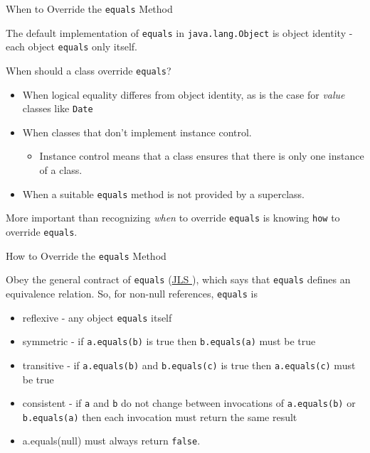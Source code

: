 \documentclass{beamer}
\begin{document}
\begin{frame}[fragile]{When to Override the {\tt equals} Method}


The default implementation of {\tt equals} in {\tt java.lang.Object} is object identity - each object {\tt equals} only itself.

When should a class override {\tt equals}?
\begin{itemize}
\item When logical equality differes from object identity, as is the case for {\it value} classes like {\tt Date}
\item When classes that don't implement instance control.
  \begin{itemize}
  \item Instance control means that a class ensures that there is only one instance of a class.  
  \end{itemize}
\item When a suitable {\tt equals} method is not provided by a superclass.
\end{itemize}

More important than recognizing {\it when} to override {\tt equals} is knowing {\tt how} to override {\tt equals}.
\end{frame}

\begin{frame}[fragile]{How to Override the {\tt equals} Method}


Obey the general contract of {\tt equals} (\href{}{JLS }), which says that {\tt equals} defines an equivalence relation.  So, for non-null references, {\tt equals} is
\begin{itemize}
\item reflexive - any object {\tt equals} itself
\item symmetric - if {\tt a.equals(b)} is true then {\tt b.equals(a)} must be true
\item transitive - if {\tt a.equals(b)} and {\tt b.equals(c)} is true then {\tt a.equals(c)} must be true
\item consistent - if {\tt a} and {\tt b} do not change between invocations of {\tt a.equals(b)} or {\tt b.equals(a)} then each invocation must return the same result
\item a.equals(null) must always return {\tt false}.
\end{itemize}


\end{frame}
\end{document}

